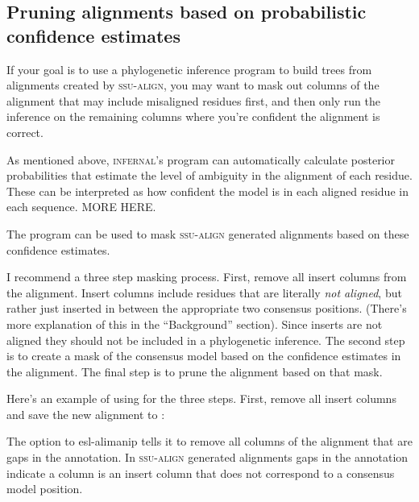 \begin{comment}
To convert the alignment to fasta format that includes gaps, you can use the
\prog{scripts/stk2aln\_fa.pl} script. 
\end{comment}

\subsection{Pruning alignments based on probabilistic confidence
  estimates}

If your goal is to use a phylogenetic inference program to build trees
from alignments created by \textsc{ssu-align}, you may want to mask
out columns of the alignment that may include misaligned residues
first, and then only run the inference on the remaining columns where
you're confident the alignment is correct. 

As mentioned above, \textsc{infernal}'s  program
can automatically calculate posterior probabilities that estimate the
level of ambiguity in the alignment of each residue. These can be
interpreted as how confident the model is in each aligned residue in
each sequence.  MORE HERE.

The  program can be used to mask
\textsc{ssu-align} generated alignments based on these confidence estimates.

I recommend a three step masking process. First, remove all insert
columns from the alignment. Insert columns include residues that are
literally \emph{not aligned}, but rather just inserted in between the
appropriate two consensus positions. (There's more explanation of this
in the ``Background'' section).  Since inserts are not aligned they
should not be included in a phylogenetic inference.  
The second step is to create a mask of the consensus model based on
the confidence estimates in the alignment. The final step is to prune
the alignment based on that mask. 

Here's an example of using  for the three steps. 
First, remove all insert columns and save the new alignment to 
:


The  option to esl-alimanip tells it to remove all columns of 
the alignment that are gaps in the  annotation. In
\textsc{ssu-align} generated alignments gaps in the 
annotation indicate a column is an insert column that does not
correspond to a consensus model position. 

